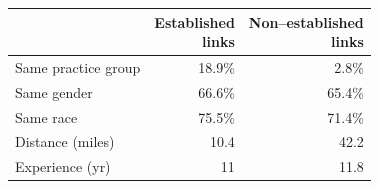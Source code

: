 
\begin{tabular}{lrr}
\toprule
  & \shortstack[r]{Established \\ links} & \shortstack[r]{Non--established \\ links}\\
\midrule
Same practice group & 18.9\% & 2.8\%\\
Same gender & 66.6\% & 65.4\%\\
Same race & 75.5\% & 71.4\%\\
Distance (miles) & 10.4 & 42.2\\
Experience (yr) & 11 & 11.8\\
\bottomrule
\end{tabular}
